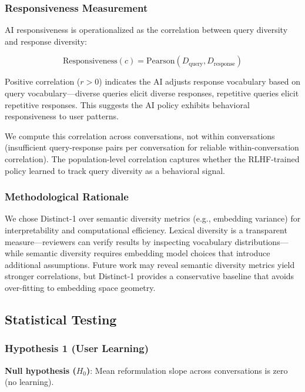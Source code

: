 \subsubsection{Responsiveness Measurement}

AI responsiveness is operationalized as the correlation between query diversity and response diversity:

\begin{equation}
\text{Responsiveness}(c) = \text{Pearson}(D_{\text{query}}, D_{\text{response}})
\end{equation}

Positive correlation ($r > 0$) indicates the AI adjusts response vocabulary based on query vocabulary---diverse queries elicit diverse responses, repetitive queries elicit repetitive responses. This suggests the AI policy exhibits behavioral responsiveness to user patterns.

We compute this correlation across conversations, not within conversations (insufficient query-response pairs per conversation for reliable within-conversation correlation). The population-level correlation captures whether the RLHF-trained policy learned to track query diversity as a behavioral signal.

\subsubsection{Methodological Rationale}

We chose Distinct-1 over semantic diversity metrics (e.g., embedding variance) for interpretability and computational efficiency. Lexical diversity is a transparent measure---reviewers can verify results by inspecting vocabulary distributions---while semantic diversity requires embedding model choices that introduce additional assumptions. Future work may reveal semantic diversity metrics yield stronger correlations, but Distinct-1 provides a conservative baseline that avoids over-fitting to embedding space geometry.

\subsection{Statistical Testing}

\subsubsection{Hypothesis 1 (User Learning)}

\textbf{Null hypothesis ($H_0$)}: Mean reformulation slope across conversations is zero (no learning).

